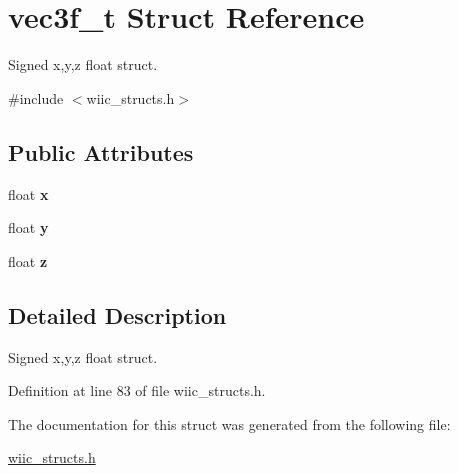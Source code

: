 \hypertarget{structvec3f__t}{\section{vec3f\-\_\-t Struct Reference}
\label{structvec3f__t}
}


Signed x,y,z float struct.  




{\ttfamily \#include $<$wiic\-\_\-structs.\-h$>$}

\subsection*{Public Attributes}
\begin{DoxyCompactItemize}
\item 
\hypertarget{structvec3f__t_a60f26fe901d34ae1b005343ef46b0eb9}{float {\bfseries x}}\label{structvec3f__t_a60f26fe901d34ae1b005343ef46b0eb9}

\item 
\hypertarget{structvec3f__t_a0758f3425f05e7419d04b3e7e588dbac}{float {\bfseries y}}\label{structvec3f__t_a0758f3425f05e7419d04b3e7e588dbac}

\item 
\hypertarget{structvec3f__t_a7994ca5509a9bc1c5ad399a31bdef420}{float {\bfseries z}}\label{structvec3f__t_a7994ca5509a9bc1c5ad399a31bdef420}

\end{DoxyCompactItemize}


\subsection{Detailed Description}
Signed x,y,z float struct. 

Definition at line 83 of file wiic\-\_\-structs.\-h.



The documentation for this struct was generated from the following file\-:\begin{DoxyCompactItemize}
\item 
\hyperlink{wiic__structs_8h}{wiic\-\_\-structs.\-h}\end{DoxyCompactItemize}
